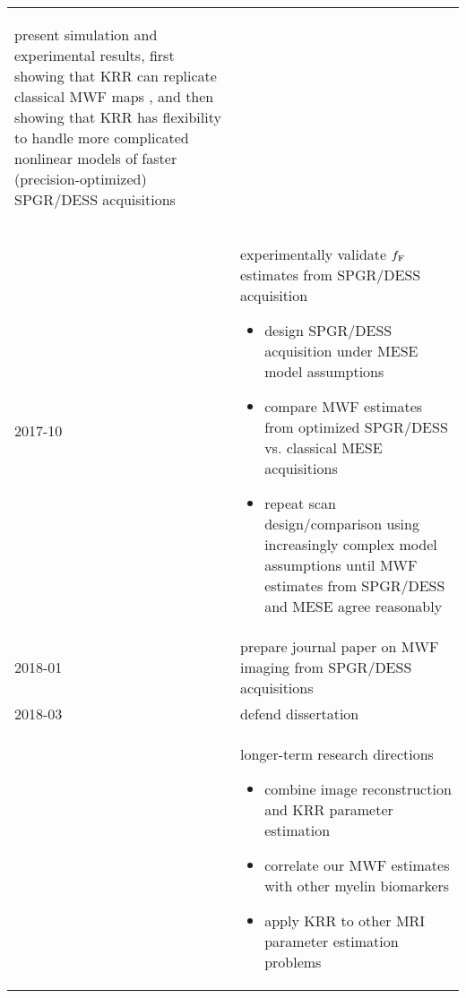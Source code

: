 \begin{table}[!ht]
\begin{tabular}{l | p{12cm}}
\begin{itemize}
{					present simulation and experimental results,
					first showing that KRR can replicate 
					classical MWF maps \invivo,
					and then showing that KRR has flexibility
					to handle more complicated nonlinear models
					of faster (precision-optimized) SPGR/DESS acquisitions
				}
			\end{itemize} \\
		2017-10 & experimentally validate $f_{\mathrm{F}}$ estimates from SPGR/DESS acquisition
			\begin{itemize}
				\setlength\topsep{0em}
				\setlength\itemsep{0em}
				\item{
					design SPGR/DESS acquisition 
					under MESE model assumptions
				}
				\item{
					compare \invivo MWF estimates 
					from optimized SPGR/DESS 
					vs. classical MESE acquisitions
				}
				\item{
					repeat scan design/comparison
					using increasingly complex model assumptions
					until MWF estimates
					from SPGR/DESS and MESE agree reasonably
				}
			\end{itemize} \\
		2018-01 & prepare journal paper on MWF imaging from SPGR/DESS acquisitions \\
		2018-03 & defend dissertation \\
		\hline
		& longer-term research directions
			\begin{itemize}
				\setlength\topsep{0em}
				\setlength\itemsep{0em}
				\item{combine image reconstruction and KRR parameter estimation}
				\item{correlate our MWF estimates with other myelin biomarkers}
				\item{apply KRR to other MRI parameter estimation problems}
			\end{itemize} \\
		\hline
		\hline
	\end{tabular}
\end{table}




